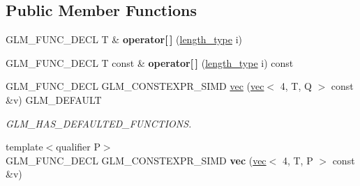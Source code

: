 \subsection*{Public Member Functions}
\begin{DoxyCompactItemize}
\item 
\mbox{\label{structglm_1_1vec_3_014_00_01T_00_01Q_01_4_a49fc7a64b8898f20a4f223a41c97eaef}} 
G\+L\+M\+\_\+\+F\+U\+N\+C\+\_\+\+D\+E\+CL T \& {\bfseries operator\mbox{[}$\,$\mbox{]}} (\hyperlink{structglm_1_1vec_3_014_00_01T_00_01Q_01_4_af1c8f56963141951f4a4724b47e072d9}{length\+\_\+type} i)
\item 
\mbox{\label{structglm_1_1vec_3_014_00_01T_00_01Q_01_4_adea890cef20b856644085cc9fb20a2a2}} 
G\+L\+M\+\_\+\+F\+U\+N\+C\+\_\+\+D\+E\+CL T const  \& {\bfseries operator\mbox{[}$\,$\mbox{]}} (\hyperlink{structglm_1_1vec_3_014_00_01T_00_01Q_01_4_af1c8f56963141951f4a4724b47e072d9}{length\+\_\+type} i) const
\item 
\mbox{\label{structglm_1_1vec_3_014_00_01T_00_01Q_01_4_ad218b24398db0a16b0df3a0e64f6f638}} 
G\+L\+M\+\_\+\+F\+U\+N\+C\+\_\+\+D\+E\+CL G\+L\+M\+\_\+\+C\+O\+N\+S\+T\+E\+X\+P\+R\+\_\+\+S\+I\+MD \hyperlink{structglm_1_1vec_3_014_00_01T_00_01Q_01_4_ad218b24398db0a16b0df3a0e64f6f638}{vec} (\hyperlink{structglm_1_1vec}{vec}$<$ 4, T, Q $>$ const \&v) G\+L\+M\+\_\+\+D\+E\+F\+A\+U\+LT
\begin{DoxyCompactList}\small\item\em G\+L\+M\+\_\+\+H\+A\+S\+\_\+\+D\+E\+F\+A\+U\+L\+T\+E\+D\+\_\+\+F\+U\+N\+C\+T\+I\+O\+NS. \end{DoxyCompactList}\item 
\mbox{\label{structglm_1_1vec_3_014_00_01T_00_01Q_01_4_a7f8d760e50fc7fb597c88ee4bf5bbcc2}} 
{\footnotesize template$<$qualifier P$>$ }\\G\+L\+M\+\_\+\+F\+U\+N\+C\+\_\+\+D\+E\+CL G\+L\+M\+\_\+\+C\+O\+N\+S\+T\+E\+X\+P\+R\+\_\+\+S\+I\+MD {\bfseries vec} (\hyperlink{structglm_1_1vec}{vec}$<$ 4, T, P $>$ const \&v)
\item 
\mbox{\label{structglm_1_1vec_3_014_00_01T_00_01Q_01_4_ad2cec87eaf8ded14b0173cef509ecdbb}} 

\end{DoxyCompactItemize}
